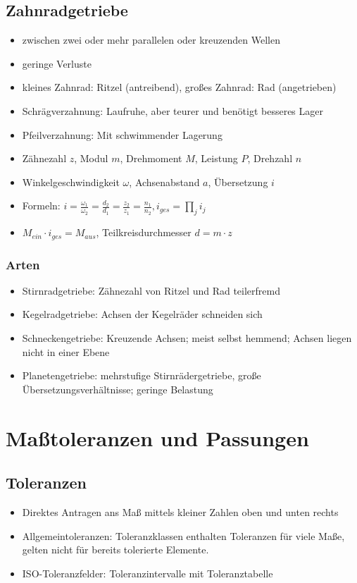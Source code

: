 \documentclass[a4paper,parskip=half*,DIV=7,fontsize=11pt]{scrartcl}
\begin{document}
\subsection{Zahnradgetriebe}
\begin{itemize}
	\item zwischen zwei oder mehr parallelen oder kreuzenden Wellen
	\item geringe Verluste
	\item kleines Zahnrad: Ritzel (antreibend), großes Zahnrad: Rad (angetrieben)
	\item Schrägverzahnung: Laufruhe, aber teurer und benötigt besseres Lager
	\item Pfeilverzahnung: Mit schwimmender Lagerung
	\item Zähnezahl $z$, Modul $m$, Drehmoment $M$, Leistung $P$, Drehzahl $n$
	\item Winkelgeschwindigkeit $\omega$, Achsenabstand $a$, Übersetzung $i$
	\item Formeln: $i=\frac{\omega_1}{\omega_2}=\frac{d_2}{d_1}=\frac{z_2}{z_1}=\frac{n_1}{n_2}, i_{ges}=\prod_{j}{} i_j$
	\item $M_{ein} \cdot i_{ges}=M_{aus}$, Teilkreisdurchmesser $d= m \cdot z$
\end{itemize}
	
\subsubsection{Arten}
\begin{itemize}
	\item Stirnradgetriebe: Zähnezahl von Ritzel und Rad teilerfremd
	\item Kegelradgetriebe: Achsen der Kegelräder schneiden sich
	\item 	Schneckengetriebe: Kreuzende Achsen; meist selbst hemmend; Achsen liegen nicht in einer Ebene
	\item 	Planetengetriebe: mehrstufige Stirnrädergetriebe, große Übersetzungsverhältnisse; geringe Belastung
\end{itemize}	
	
\section{Maßtoleranzen und Passungen}
\subsection{Toleranzen}
\begin{itemize}
	\item Direktes Antragen ans Maß mittels kleiner Zahlen oben und unten rechts
	\item Allgemeintoleranzen: Toleranzklassen enthalten Toleranzen für viele Maße, gelten nicht für bereits tolerierte Elemente.
	\item ISO-Toleranzfelder: Toleranzintervalle mit Toleranztabelle
\end{itemize}
	
\end{document}
